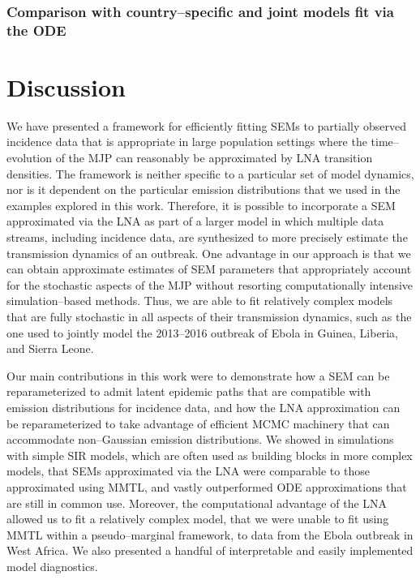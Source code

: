 \subsubsection{Comparison with country--specific and joint models fit via the ODE}
\label{subsubsec:ebola_lna_vs_ode}

\newpage
\section{Discussion}
\label{sec:lna_discussion}

We have presented a framework for efficiently fitting SEMs to partially observed incidence data that is appropriate in large population settings where the time--evolution of the MJP can reasonably be approximated by LNA transition densities. The framework is neither specific to a particular set of model dynamics, nor is it dependent on the particular emission distributions that we used in the examples explored in this work. Therefore, it is possible to incorporate a SEM approximated via the LNA as part of a larger model in which multiple data streams, including incidence data, are synthesized to more precisely estimate the transmission dynamics of an outbreak. One advantage in our approach is that we can obtain approximate estimates of SEM parameters that appropriately account for the stochastic aspects of the MJP without resorting computationally intensive simulation--based methods. Thus, we are able to fit relatively complex models that are fully stochastic in all aspects of their transmission dynamics, such as the one used to jointly model the 2013--2016 outbreak of Ebola in Guinea, Liberia, and Sierra Leone. 

Our main contributions in this work were to demonstrate how a SEM can be reparameterized to admit latent epidemic paths that are compatible with emission distributions for incidence data, and how the LNA approximation can be reparameterized to take advantage of efficient MCMC machinery that can accommodate non--Gaussian emission distributions. We showed in simulations with simple SIR models, which are often used as building blocks in more complex models, that SEMs approximated via the LNA were comparable to those approximated using MMTL, and vastly outperformed ODE approximations that are still in common use. Moreover, the computational advantage of the LNA allowed us to fit a relatively complex model, that we were unable to fit using MMTL within a pseudo--marginal framework, to data from the Ebola outbreak in West Africa. We also presented a handful of interpretable and easily implemented model diagnostics.  


